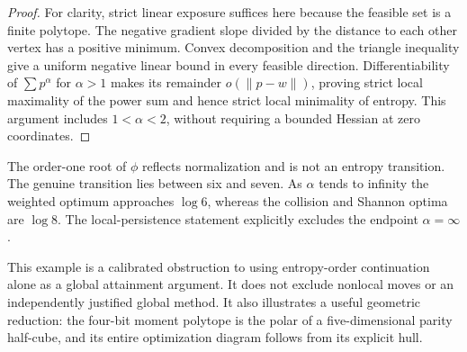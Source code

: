\begin{proof}
For clarity, strict linear exposure suffices here because the feasible
set is a finite polytope. The negative gradient slope divided by the
distance to each other vertex has a positive minimum. Convex
decomposition and the triangle inequality give a uniform negative
linear bound in every feasible direction. Differentiability of
$\sum p^\alpha$ for $\alpha>1$ makes its remainder $o(\|p-w\|)$,
proving strict local maximality of the power sum and hence strict
local minimality of entropy. This argument includes $1<\alpha<2$,
without requiring a bounded Hessian at zero coordinates.
\end{proof}

The order-one root of $\phi$ reflects normalization and is not an
entropy transition. The genuine transition lies between six and seven.
As $\alpha$ tends to infinity the weighted optimum approaches
$\log6$, whereas the collision and Shannon optima are $\log8$.
The local-persistence statement explicitly excludes the endpoint
$\alpha=\infty$.

This example is a calibrated obstruction to using entropy-order
continuation alone as a global attainment argument. It does not
exclude nonlocal moves or an independently justified global method.
It also illustrates a useful geometric reduction: the four-bit
moment polytope is the polar of a five-dimensional parity half-cube,
and its entire optimization diagram follows from its explicit hull.
